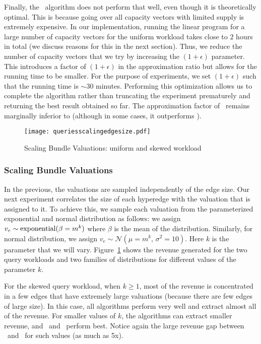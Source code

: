 Finally, the \cip\ algorithm does not perform that well, even though it is theoretically optimal. This is because going over all capacity vectors with limited supply is extremely expensive. In our implementation, running the linear program for a large number of capacity vectors for the uniform workload takes close to $2$ hours in total (we discuss reasons for this in the next section). Thus, we reduce the number of capacity vectors that we try by increasing the $(1+\epsilon)$ parameter. This introduces a factor of $(1+\epsilon)$ in the approximation ratio but allows for the running time to be smaller. For the purpose of experiments, we set $(1+\epsilon)$ such that the running time is $\sim 30$ minutes. Performing this optimization allows us to complete the algorithm rather than truncating the experiment prematurely and returning the best result obtained so far.  The approximation factor of \cip\ remains marginally inferior to \lpip (although in some cases, it outperforms \lpip). 


\begin{figure}[!t]
	\centering
	\texttt{[image: queriesscalingedgesize.pdf]}
	\caption{Scaling Bundle Valuations: uniform and skewed workload} \label{fig:scalingedge}
\end{figure}  

\subsubsection{Scaling Bundle Valuations} In the previous, the valuations are sampled independently of the edge size. Our next experiment correlates the size of each hyperedge with the valuation that is assigned to it. 
To achieve this, we sample each valuation from the parameterized exponential and normal distribution as follows: we assign $v_e \sim {\rm exponential} (\beta = m^k)$ where $\beta$ is the mean of the distribution. Similarly, for normal distribution, we assign $v_e \sim \mathcal{N}(\mu = m^k,\, \sigma^2 = 10)$. Here $k$ is the parameter that we will vary. Figure~\ref{fig:scalingedge} shows the revenue
generated for the two query workloads and two families of distributions for 
different values of the parameter $k$. 

For the skewed query workload, when $k \geq 1$, most of the revenue is concentrated in a few edges that have extremely large valuations (because there are few edges of large size). In this case, all
algorithms perform very well and extract almost all of the revenue. For smaller values of $k$, the algorithms can extract smaller revenue, and \lpip\ and \cip\ perform best. Notice again the large revenue gap between \lpip\ and \uip\ for such values (as much as 5x).

